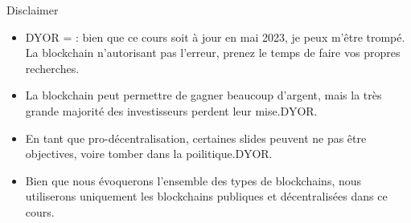 \begin{frame}{Disclaimer}
  \begin{itemize}
    \item DYOR =  : bien que ce cours soit à jour en mai 2023, je peux m'être trompé. La blockchain n'autorisant pas l'erreur, prenez le temps de faire vos propres recherches.\pause
    \item La blockchain peut permettre de gagner beaucoup d'argent, mais la très grande majorité des investisseurs perdent leur mise.\pause DYOR.\pause
    \item En tant que pro-décentralisation, certaines slides peuvent ne pas être objectives, voire tomber dans la poilitique.\pause DYOR.\pause
    \item Bien que nous évoquerons l'ensemble des types de blockchains, nous utiliserons uniquement les blockchains publiques et décentralisées dans ce cours.
  \end{itemize}
\end{frame}